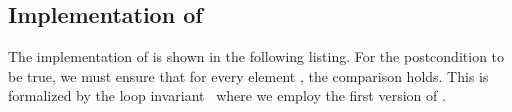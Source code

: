 

\subsection{Implementation of \reversecopy}

The implementation of  is shown in the following listing.
%
For the postcondition to be true, we must ensure that for
every element , the comparison  holds.
This is formalized by the loop invariant~ where we employ
the first version of .



\clearpage

